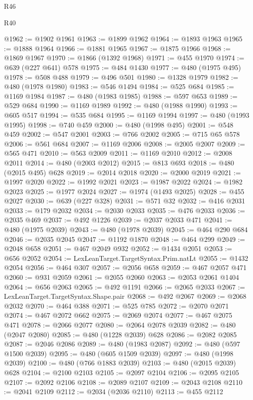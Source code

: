 \begin{lexlean}{R46}
\begin{lexlean}{R40}
\begin{coremodule}
{{{{{{{{{{{{{{{{{{{{{{{{{{{{{{{{{{{{{{{{{{{{{{{{{{{{{{{{{{{{{{{{{{{{{{{{{{{{{{{{{{{{{{{{{{{{{{{{{{{{{{{{{{{{{@1962 := @1902 @1961
@1963 := @1899 @1962
@1964 := @1893 @1963
@1965 := @1888 @1964
@1966 := @1881 @1965
@1967 := @1875 @1966
@1968 := @1869 @1967
@1970 := @1866 (@1392 @1968)
@1971 := @455 @1970
@1974 := @639 (@227 @641) @578
@1975 := @484 @1430
@1977 := @480 (@1975 @495)
@1978 := @508 @488
@1979 := @496 @501
@1980 := @1328 @1979
@1982 := @480 (@1978 @1980)
@1983 := @546 @1494
@1984 := @525 @684
@1985 := @1169 @1984
@1987 := @480 (@1983 @1985)
@1988 := @597 @653
@1989 := @529 @684
@1990 := @1169 @1989
@1992 := @480 (@1988 @1990)
@1993 := @605 @517
@1994 := @535 @684
@1995 := @1169 @1994
@1997 := @480 (@1993 @1995)
@1998 := @740 @459
@2000 := @480 (@1998 @495)
@2001 := @548 @459
@2002 := @547 @2001
@2003 := @766 @2002
@2005 := @715 @65 @578
@2006 := @561 @684
@2007 := @1169 @2006
@2008 := @2005 @2007
@2009 := @565 @471
@2010 := @563 @2009
@2011 := @1169 @2010
@2012 := @2008 @2011
@2014 := @480 (@2003 @2012)
@2015 := @813 @693
@2018 := @480 (@2015 @495) @628
@2019 := @2014 @2018
@2020 := @2000 @2019
@2021 := @1997 @2020
@2022 := @1992 @2021
@2023 := @1987 @2022
@2024 := @1982 @2023
@2025 := @1977 @2024
@2027 := @1974 (@1493 @2025)
@2028 := @455 @2027
@2030 := @639 (@227 @328)
@2031 := @571 @32
@2032 := @416 @2031
@2033 := @179 @2032
@2034 := @2030 @2033
@2035 := @476 @2033
@2036 := @2035 @469
@2037 := @492 @1226
@2039 := @2037 @2033 @471
@2041 := @480 (@1975 @2039)
@2043 := @480 (@1978 @2039)
@2045 := @464 @290 @684
@2046 := @2035 @2045
@2047 := @1192 @1870
@2048 := @464 @299
@2049 := @2048 @658
@2051 := @467 @2049 @932
@2052 := @1434 @2051
@2053 := @656 @2052
@2054 := LexLeanTarget.TargetSyntax.Prim.natLt
@2055 := @1432 @2054
@2056 := @464 @307
@2057 := @2056 @658
@2059 := @467 @2057 @471
@2060 := @931 @2059
@2061 := @2055 @2060
@2063 := @2053 @2061 @1404
@2064 := @656 @2063
@2065 := @492 @1191
@2066 := @2065 @2033
@2067 := LexLeanTarget.TargetSyntax.Shape.pair
@2068 := @492 @2067
@2069 := @2068 @2032
@2070 := @464 @388
@2071 := @525 @785
@2072 := @2070 @2071
@2074 := @467 @2072 @662
@2075 := @2069 @2074
@2077 := @467 @2075 @471
@2078 := @2066 @2077
@2080 := @2064 @2078 @2039
@2082 := @480 (@2047 @2080)
@2085 := @480 (@1228 @2039) @628
@2086 := @2082 @2085
@2087 := @2046 @2086
@2089 := @480 (@1983 @2087)
@2092 := @480 (@597 @1500 @2039)
@2095 := @480 (@605 @1509 @2039)
@2097 := @480 (@1998 @2039)
@2100 := @480 (@766 @1883 @2039)
@2103 := @480 (@2015 @2039) @628
@2104 := @2100 @2103
@2105 := @2097 @2104
@2106 := @2095 @2105
@2107 := @2092 @2106
@2108 := @2089 @2107
@2109 := @2043 @2108
@2110 := @2041 @2109
@2112 := @2034 (@2036 @2110)
@2113 := @455 @2112
}}}}}}}}}}}}}}}}}}}}}}}}}}}}}}}}}}}}}}}}}}}}}}}}}}}}}}}}}}}}}}}}}}}}}}}}}}}}}}}}}}}}}}}}}}}}}}}}}}}}}}}}}}}}}
\end{coremodule}
\end{lexlean}
\end{lexlean}
